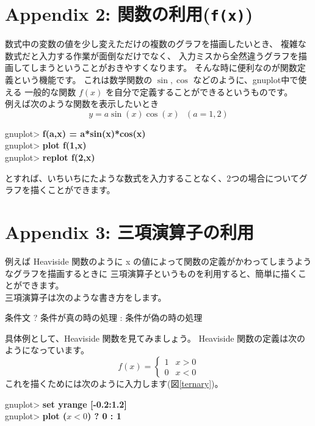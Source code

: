 \documentclass[a4j]{ujarticle} %
\newenvironment{terminal}{%
  \begin{center}
   \begin{minipage}{.8\textwidth}
    \setlength{\FrameSep}{.5\FrameSep}%
    \begin{framed}\ttfamily\small%
     \setlength\baselineskip{.85\baselineskip}%
}{%
    \end{framed}
   \end{minipage}
  \end{center}%
}
\begin{document}
\section*{Appendix 2:  関数の利用({\tt\bf f(x)})}
数式中の変数の値を少し変えただけの複数のグラフを描画したいとき、
複雑な数式だと入力する作業が面倒なだけでなく、
入力ミスから全然違うグラフを描画してしまうということがおきやすくなります。
そんな時に便利なのが関数定義という機能です。
これは数学関数の $\sin,\cos$ などのように、gnuplot中で使える
一般的な関数 $f(x)$ を自分で定義することができるというものです。\\
例えば次のような関数を表示したいとき
\begin{equation}
 y = a\sin(x)\cos(x)\ \ \ (a=1,2)
\end{equation}
\begin{terminal}
gnuplot> {\bf f(a,x) = a*sin(x)*cos(x)}\\
 gnuplot> {\bf plot f(1,x)}\\
 gnuplot> {\bf replot f(2,x)}
\end{terminal}
とすれば、いちいちにたような数式を入力することなく、2つの場合についてグラフを描くことができます。

\section*{Appendix 3:  三項演算子の利用}
例えば Heaviside 関数のように x の値によって関数の定義がかわってしまうようなグラフを描画するときに
三項演算子というものを利用すると、簡単に描くことができます。\\
三項演算子は次のような書き方をします。\\
\begin{center}
 条件文 ? 条件が真の時の処理 : 条件が偽の時の処理
\end{center}
具体例として、Heaviside 関数を見てみましょう。
Heaviside 関数の定義は次のようになっています。
\begin{equation}
 f(x) = \left\{
	\begin{array}{lr}
	 1 & x > 0\\
	 0 & x < 0
	\end{array}
	\right.
\end{equation}
これを描くためには次のように入力します(図\ref{ternary})。
\begin{terminal}
 gnuplot> {\bf set yrange [-0.2:1.2]}\\
 gnuplot> {\bf plot ($x < 0$) ? 0 : 1} 
\end{terminal}
\end{document}
